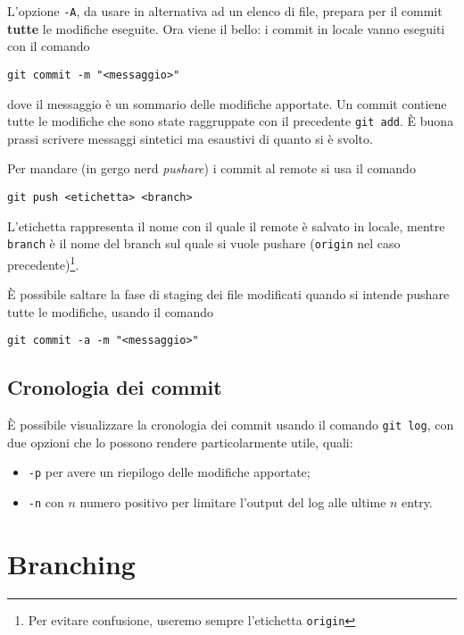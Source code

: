 \documentclass[a4paper, 11pt]{article}
\begin{document}
	L'opzione \lstinline|-A|, da usare in alternativa ad un elenco di file, prepara per il commit \textbf{tutte} le modifiche eseguite.
	Ora viene il bello: i commit in locale vanno eseguiti con il comando \begin{lstlisting}
git commit -m "<messaggio>"
	\end{lstlisting}
	dove il messaggio è un sommario delle modifiche apportate. Un commit contiene tutte le modifiche che sono state raggruppate con il precedente \lstinline|git add|. È buona prassi scrivere messaggi sintetici ma esaustivi di quanto si è svolto.
	
	Per mandare (in gergo nerd \emph{pushare}) i commit al remote si usa il comando \begin{lstlisting}
git push <etichetta> <branch>
	\end{lstlisting}
	L'etichetta rappresenta il nome con il quale il remote è salvato in locale, mentre \lstinline|branch| è il nome del branch sul quale si vuole pushare (\lstinline|origin| nel caso precedente)\footnote{Per evitare confusione, useremo sempre l'etichetta \lstinline|origin|}.
	
	È possibile saltare la fase di staging dei file modificati quando si intende pushare tutte le modifiche, usando il comando \begin{lstlisting}
git commit -a -m "<messaggio>"
	\end{lstlisting}
	
	\subsection{Cronologia dei commit}
	È possibile visualizzare la cronologia dei commit usando il comando \lstinline|git log|, con due opzioni che lo possono rendere particolarmente utile, quali:
	\begin{itemize}
		\item \lstinline|-p| per avere un riepilogo delle modifiche apportate;
		\item \lstinline|-n| con $n$ numero positivo per limitare l'output del log alle ultime $n$ entry.
	\end{itemize}
	
	\section{Branching}
\end{document}
